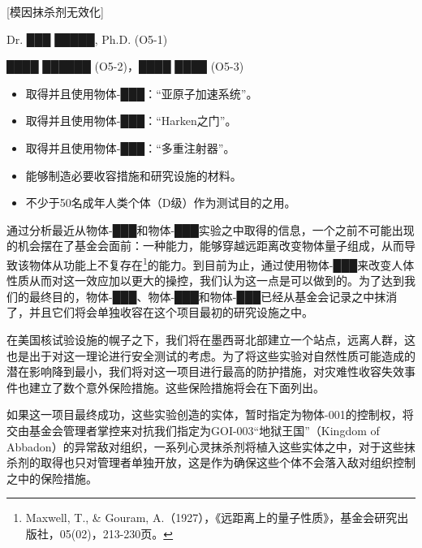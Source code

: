 


\begin{scpboxc}
{[模因抹杀剂无效化]}
\end{scpboxc}

\begin{scpboxbbwm}





 Dr. ███ █████, Ph.D. (O5-1)

 ████ ██████ (O5-2)，████ ████ (O5-3)


\begin{itemize}
	\item 取得并且使用物体-███：“亚原子加速系统”。
	\item 取得并且使用物体-███：“Harken之门”。
	\item 取得并且使用物体-███：“多重注射器”。
	\item 能够制造必要收容措施和研究设施的材料。
	\item 不少于50名成年人类个体（D级）作为测试目的之用。
\end{itemize}
	

通过分析最近从物体-███和物体-███实验之中取得的信息，一个之前不可能出现的机会摆在了基金会面前：一种能力，能够穿越远距离改变物体量子组成，从而导致该物体从功能上不复存在\footnote{Maxwell, T., \& Gouram, A.（1927），《远距离上的量子性质》，基金会研究出版社，05(02)，213-230页。}的能力。到目前为止，通过使用物体-███来改变人体性质从而对这一效应加以更大的操控，我们认为这一点是可以做到的。为了达到我们的最终目的，物体-███、物体-███和物体-███已经从基金会记录之中抹消了，并且它们将会单独收容在这个项目最初的研究设施之中。

在美国核试验设施的幌子之下，我们将在墨西哥北部建立一个站点，远离人群，这也是出于对这一理论进行安全测试的考虑。为了将这些实验对自然性质可能造成的潜在影响降到最小，我们将对这一项目进行最高的防护措施，对灾难性收容失效事件也建立了数个意外保险措施。这些保险措施将会在下面列出。

如果这一项目最终成功，这些实验创造的实体，暂时指定为物体-001的控制权，将交由基金会管理者掌控来对抗我们指定为GOI-003“地狱王国”（Kingdom of Abbadon）的异常敌对组织，一系列心灵抹杀剂将植入这些实体之中，对于这些抹杀剂的取得也只对管理者单独开放，这是作为确保这些个体不会落入敌对组织控制之中的保险措施。

\end{scpboxbbwm}

